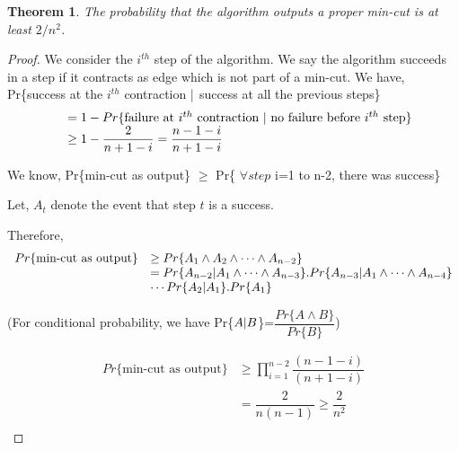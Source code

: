 \documentclass[a4paper,10pt]{article}
\newtheorem{myth}{Theorem}
\begin{document}
\begin{myth}
 The probability that the algorithm outputs a proper min-cut is at least $2/n^{2}$.
\end{myth}
\begin{proof}
 We consider the $i^{th}$ step of the algorithm. We say the algorithm succeeds in a step if it contracts
as edge which is not part of a min-cut. We have,\\
Pr\{success at the $i^{th}$ contraction $\arrowvert$ success at all the previous steps\}\\
\begin{equation*}
 \begin{array}{ll}
  &= 1 - Pr\{\mbox{failure at $i^{th}$ contraction $\arrowvert$ no failure before $i^{th}$ step}\}\\
  &\geq 1- \dfrac{2}{n + 1 -i} = \dfrac{n-1-i}{n+1-i}\\ 
 \end{array}
\end{equation*}

\noindent We know, Pr\{min-cut as output\} $\geq$ Pr\{ $\forall step$ i=1 to n-2, there was success\}

\noindent Let, $A_{t}$ denote the event that step $t$ is a success.

\noindent Therefore,
\begin{equation*}
 \begin{array}{ll}
    Pr\{\mbox{min-cut as output}\}&\geq Pr\{A_{1} \wedge A_{2} \wedge \cdots \wedge A_{n-2}\}\\
    &= Pr\{A_{n-2}\arrowvert A_{1} \wedge \cdots \wedge A_{n-3}\}.Pr\{A_{n-3}\arrowvert A_{1} \wedge\cdots \wedge A_{n-4}\}\\
    &  \cdots Pr\{A_{2}\arrowvert A_{1}\} . Pr\{A_{1}\}\\
  \end{array}
\end{equation*}

\noindent(For conditional probability, we have
Pr\{$A\arrowvert B$\}=$\dfrac{Pr\{A\wedge B\}}{Pr\{B\}}$)

\begin{equation*}
 \begin{array}{ll}
    Pr\{\mbox{min-cut as output}\}&\geq \displaystyle\prod_{i=1}^{n-2} \dfrac{(n-1-i)}{(n+1-i)}\\
    &= \dfrac{2}{n(n-1)} \geq \dfrac{2}{n^{2}}\\
  \end{array}
\end{equation*}

\end{proof}
\end{document}
